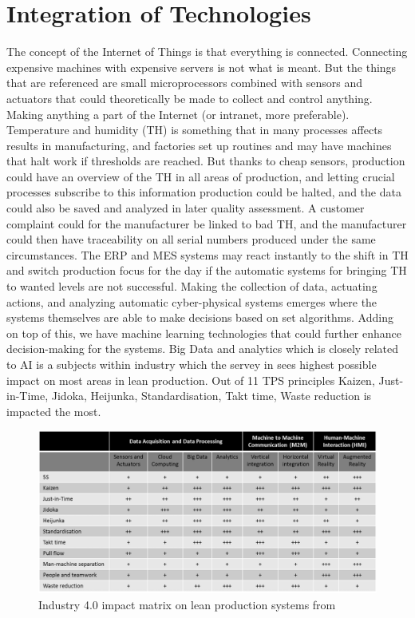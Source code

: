 \documentclass[article,a4paper]{IEEEtran}
\begin{document}
    \section{Integration of Technologies}
    The concept of the Internet of Things is that everything is connected. Connecting expensive machines with expensive servers is not what is meant. But the things that are referenced are small microprocessors combined with sensors and actuators that could theoretically be made to collect and control anything. Making anything a part of the Internet (or intranet, more preferable). Temperature and humidity (TH) is something that in many processes affects results in manufacturing, and factories set up routines and may have machines that halt work if thresholds are reached. But thanks to cheap sensors, production could have an overview of the TH in all areas of production, and letting crucial processes subscribe to this information production could be halted, and the data could also be saved and analyzed in later quality assessment. A customer complaint could for the manufacturer be linked to bad TH, and the manufacturer could then have traceability on all serial numbers produced under the same circumstances. The ERP and MES systems may react instantly to the shift in TH and switch production focus for the day if the automatic systems for bringing TH to wanted levels are not successful. 
    \newline\newline
    Making the collection of data, actuating actions, and analyzing automatic cyber-physical systems emerges where the systems themselves are able to make decisions based on set algorithms. Adding on top of this, we have machine learning technologies that could further enhance decision-making for the systems. Big Data and analytics which is closely related to AI is a subjects within industry which the servey in \cite{Impact_Lean_Prod} sees highest possible impact on most areas in lean production. Out of 11 TPS principles Kaizen, Just-in-Time, Jidoka, Heijunka, Standardisation, Takt time, Waste reduction is impacted the most. 
    \begin{figure}
        \includegraphics[width=\columnwidth]{ImpactMatrix.png} 
        \caption{Industry 4.0 impact matrix on lean production systems from \cite{Impact_Lean_Prod}}
        \label{fig2:Impact Matrix} 
    \end{figure}
\end{document}
